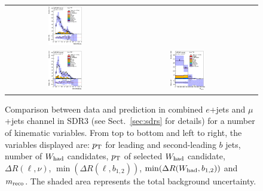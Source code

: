\begin{figure}[htbp]
\begin{center}
\begin{tabular}{ccc}
\includegraphics[width=0.30\textwidth]{appendices/figures/sdrs/VLQAna_WbX_MinDRlb_ELEMUONCR2_1W_NOMINAL.eps} \\
\includegraphics[width=0.30\textwidth]{appendices/figures/sdrs/VLQAna_WbX_MinDRWb_ELEMUONCR2_1W_NOMINAL.eps} &
\includegraphics[width=0.30\textwidth]{appendices/figures/sdrs/VLQAna_WbX_1W_MWb_4_ELEMUONCR2_1W_NOMINAL.eps} & \\
\end{tabular}\caption{\small {Comparison between data and prediction in combined $e$+jets and $\mu$+jets channel in SDR3 (see Sect.~\ref{sec:sdrs} for details) 
for a number of kinematic variables. From top to bottom and left to right, the variables displayed are: $\pt$ for leading and second-leading $b$ jets,
number of $W_{\rm had}$  candidates, $\pt$ of selected $W_{\rm had}$  candidate, $\Delta R(\ell,\nu)$, $\min(\Delta R(\ell, b_{1,2}))$, 
$\min(\Delta R(W_{\rm had}, b_{1,2}))$ and $m_{\rm reco}$.
The shaded area represents the total background uncertainty.}}
\label{fig:ELEMUONCR2_3}
\end{center}
\end{figure}                                                                             
